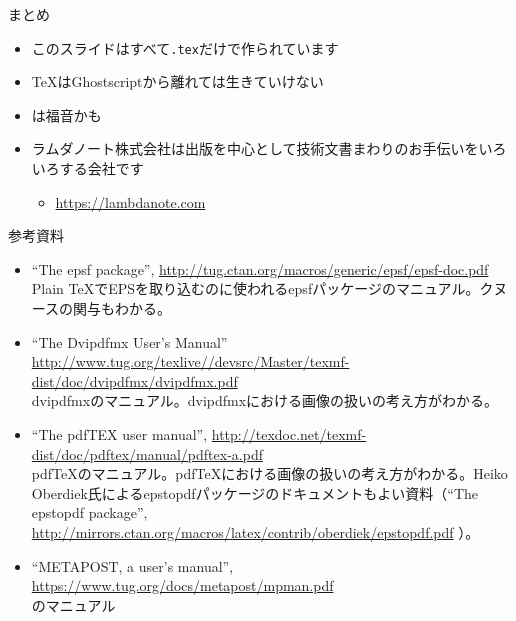 \documentclass[14pt,dvipdfmx,uplatex]{beamer}
\begin{document}
\begin{frame}[t]{\inhibitglue まとめ}
  \sffamily
  \begin{itemize}
    \item このスライドはすべて\texttt{.tex}だけで作られています
    \item \TeX{}はGhostscriptから離れては生きていけない
    \item {}は福音かも
    \item ラムダノート株式会社は出版を中心として技術文書まわりのお手伝いをいろいろする会社です
    \begin{itemize}
      \item \url{https://lambdanote.com}
    \end{itemize}
  \end{itemize}
  \begin{center}
  \resizebox{.5\textwidth}{!}{}
  \end{center}
\end{frame}

\begin{frame}[t]{\inhibitglue 参考資料}
  \sffamily
  \fontsize{9pt}{9pt}\selectfont

  \begin{itemize}
    \item ``The epsf package'', \url{http://tug.ctan.org/macros/generic/epsf/epsf-doc.pdf} \\
    Plain \TeX{}でEPSを取り込むのに使われるepsfパッケージのマニュアル。クヌースの関与もわかる。
    \item ``The Dvipdfmx User’s Manual'' \url{http://www.tug.org/texlive//devsrc/Master/texmf-dist/doc/dvipdfmx/dvipdfmx.pdf}\\
     dvipdfmxのマニュアル。dvipdfmxにおける画像の扱いの考え方がわかる。
    \item ``The pdfTEX user manual'', \url{http://texdoc.net/texmf-dist/doc/pdftex/manual/pdftex-a.pdf}\\
     pdf\TeX{}のマニュアル。pdf\TeX{}における画像の扱いの考え方がわかる。Heiko Oberdiek氏によるepstopdfパッケージのドキュメントもよい資料（``The epstopdf package'', \url{http://mirrors.ctan.org/macros/latex/contrib/oberdiek/epstopdf.pdf} ）。
    \item ``METAPOST, a user's manual'', \url{https://www.tug.org/docs/metapost/mpman.pdf} \\
    のマニュアル
  \end{itemize}

\end{frame}
\end{document}
